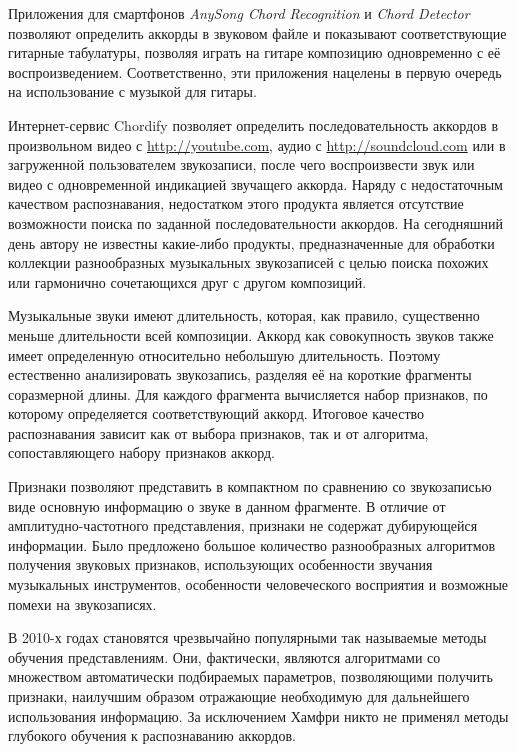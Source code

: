 Приложения для смартфонов \emph{AnySong Chord Recognition}
\cite{AnySongChordRecognition} и \emph{Chord Detector} \cite{ChordDetector} позволяют
определить аккорды в звуковом файле и показывают соответствующие гитарные
табулатуры, позволяя играть на гитаре композицию одновременно с её
воспроизведением. Соответственно, эти приложения нацелены в первую очередь на
использование с музыкой для гитары.

Интернет-сервис Chordify \cite{Chordify} позволяет определить последовательность
аккордов в произвольном видео с \url{http://youtube.com}, аудио с
\url{http://soundcloud.com} или в загруженной пользователем звукозаписи, после
чего воспроизвести звук или видео с одновременной индикацией звучащего аккорда.
Наряду с недостаточным качеством распознавания, недостатком этого продукта
является отсутствие возможности поиска по заданной последовательности аккордов.
На сегодняшний день автору не известны какие-либо продукты, предназначенные для
обработки коллекции разнообразных музыкальных звукозаписей с целью поиска
похожих или гармонично сочетающихся друг с другом композиций.

Музыкальные звуки имеют длительность, которая, как правило, существенно меньше
длительности всей композиции. Аккорд как совокупность звуков также имеет
определенную относительно небольшую длительность. Поэтому естественно
анализировать звукозапись, разделяя её на короткие фрагменты соразмерной длины.
Для каждого фрагмента вычисляется набор признаков, по которому определяется
соответствующий аккорд. Итоговое качество распознавания зависит как от выбора
признаков, так и от алгоритма, сопоставляющего набору признаков аккорд.

Признаки позволяют представить в компактном по сравнению со звукозаписью виде
основную информацию о звуке в данном фрагменте. В отличие от
амплитудно-частотного представления, признаки не содержат дубирующейся
информации. Было предложено большое количество разнообразных алгоритмов
получения звуковых признаков, использующих особенности звучания музыкальных
инструментов, особенности человеческого восприятия и возможные помехи на
звукозаписях.

В 2010-х годах становятся чрезвычайно популярными так называемые методы
обучения представлениям. Они, фактически, являются алгоритмами со множеством
автоматически подбираемых параметров, позволяющими получить признаки, наилучшим
образом отражающие необходимую для дальнейшего использования информацию. За
исключением Хамфри \cite{Humphrey2012} никто не применял методы глубокого
обучения к распознаванию аккордов.

